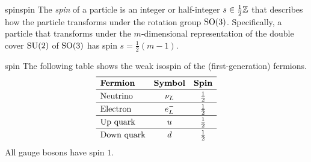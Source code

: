 
    

\begin{topic}{spin}{spin}
    The \emph{spin} of a particle is an integer or half-integer $s \in \tfrac{1}{2} \mathbb{Z}$ that describes how the particle transforms under the rotation group $\textup{SO}(3)$. Specifically, a particle that transforms under the $m$-dimensional representation of the double cover $\textup{SU}(2)$ of $\textup{SO}(3)$ has spin $s = \tfrac{1}{2} (m - 1)$.
\end{topic}

\begin{example}{spin}
    The following table shows the weak isospin of the (first-generation) fermions.
    \[ \def\arraystretch{1.25} \begin{array}{lcc}
         \hline \textbf{Fermion} & \textbf{Symbol} & \textbf{Spin} \\
         \hline \textup{Neutrino} & \nu_L & \tfrac{1}{2} \\
         \hline \textup{Electron} & e^-_L & \tfrac{1}{2} \\
         \hline \textup{Up quark} & u & \tfrac{1}{2} \\
         \hline \textup{Down quark} & d & \tfrac{1}{2} \\
    \end{array} \]
    All gauge bosons have spin $1$.
\end{example}
